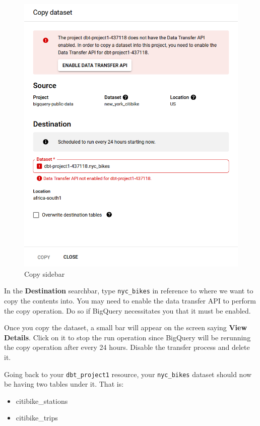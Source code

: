\documentclass[
]{book}
\providecommand{\tightlist}{%
  \setlength{\itemsep}{0pt}\setlength{\parskip}{0pt}}
\begin{document}
\begin{figure}
\centering
\includegraphics{./images/copy_sidebar.png}
\caption{Copy sidebar}
\end{figure}

In the \textbf{Destination} searchbar, type \texttt{nyc\_bikes} in reference to where we want to copy the contents into. You may need to enable the data transfer API to perform the copy operation. Do so if BigQuery necessitates you that it must be enabled.

Once you copy the dataset, a small bar will appear on the screen saying \textbf{View Details}. Click on it to stop the run operation since BigQuery will be rerunning the copy operation after every 24 hours. Disable the transfer process and delete it.

Going back to your \texttt{dbt\_project1} resource, your \texttt{nyc\_bikes} dataset should now be having two tables under it. That is:

\begin{itemize}
\tightlist
\item
  citibike\_stations
\item
  citibike\_trips
\end{itemize}
\end{document}
